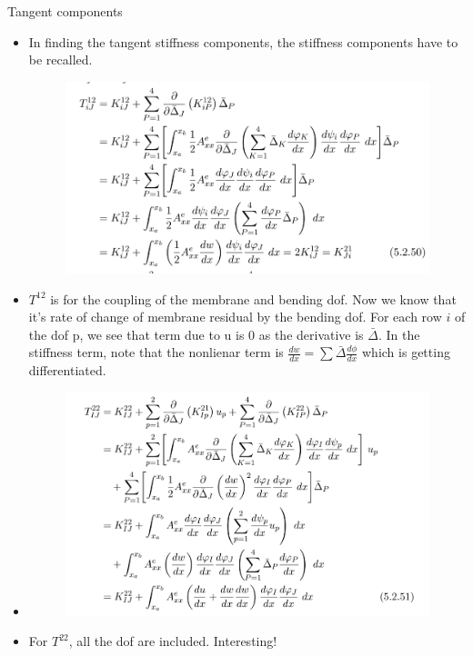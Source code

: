 	\begin{frame}{Tangent components}
		\begin{itemize}
			\item In finding the tangent stiffness components, the stiffness components have to be recalled. 
			\begin{figure}
				\centering
				\includegraphics[width=0.7\linewidth]{Figure/4}
				\label{fig:4}
			\end{figure}
			\item $T^{12}$ is for the coupling of the membrane and bending dof. Now we know that it's rate of change of membrane residual by the bending dof. For each row $i$ of the dof p, we see that term due to u is 0 as the derivative is $\bar{\Delta}$. In the stiffness term, note that the nonlienar term is $\frac{dw}{dx} = \sum \bar{\Delta} \frac{d \phi}{dx}$ which is getting differentiated.
		\end{itemize}
	\end{frame}


	\begin{frame}
		\begin{itemize}
			\item %
			\begin{figure}
				\centering
				\includegraphics[width=0.7\linewidth]{Figure/5}
				\label{fig:5}
			\end{figure}
			 \item For $T^{22}$, all the dof are included. Interesting!
			
		\end{itemize}
	\end{frame}


